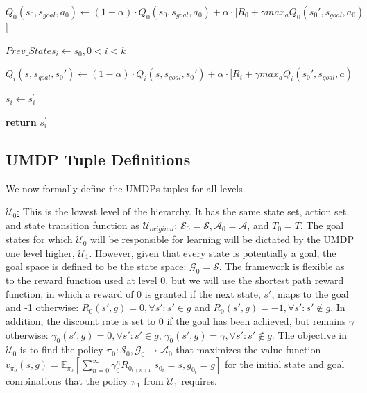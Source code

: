 \documentclass{article} %
\begin{document}
\begin{algorithm}
\begin{algorithmic}
        \State {}
                	\State $Q_0(s_0,s_{goal},a_0) \gets (1-\alpha) \cdot Q_0(s_0,s_{goal},a_0) + \alpha \cdot [R_0 + \gamma max_a Q_0(s_0',s_{goal},a_0)$]
                \EndFor  
                
        \State {}
        \State $Prev\_States_i \gets s_0, 0 < i < k$ 
        
        \State {}
                    	\State $Q_i(s,s_{goal},s_0') \gets (1-\alpha) \cdot Q_i(s,s_{goal},s_0') + \alpha \cdot [R_i + \gamma max_a Q_i(s_0',s_{goal},a)$
            	\EndFor
            \EndFor
        \EndFor
    \EndIf
    
    \State $s_i \gets s_i^{'}$
\EndFor

\State \textbf{return} $s_i^{'}$
\EndFunction



\end{algorithmic}
\end{algorithm}

\subsection{UMDP Tuple Definitions} \label{UMDP}

We now formally define the UMDPs tuples for all levels.

\underline{$\mathcal{U}_0$:} This is the lowest level of the hierarchy. It has the same state set, action set, and state transition function as $\mathcal{U}_{original}$: $\mathcal{S}_0 = \mathcal{S}, \mathcal{A}_0 = \mathcal{A}$, and $T_0 = T$. The goal states for which $\mathcal{U}_0$ will be responsible for learning will be dictated by the UMDP one level higher, $\mathcal{U}_1$.  However, given that every state is potentially a goal, the goal space is defined to be the state space: $\mathcal{G}_0 = \mathcal{S}$. The framework is flexible as to the reward function used at level 0, but we will use the shortest path reward function, in which a reward of 0 is granted if the next state, $s'$, maps to the goal and -1 otherwise: $R_0(s',g) = 0, \forall s': s' \in g$ and $R_0(s',g) = -1, \forall s': s' \notin g$.  In addition, the discount rate is set to 0 if the goal has been achieved, but remains $\gamma$ otherwise: $\gamma_0(s',g) = 0, \forall s': s' \in g$, $\gamma_0(s',g) = \gamma, \forall s': s' \notin g$.  The objective in $\mathcal{U}_0$ is to find the policy $\pi_0: \mathcal{S}_0,\mathcal{G}_0 \rightarrow \mathcal{A}_0$ that maximizes the value function $v_{\pi_0}(s,g) = \mathbb{E}_{\pi_0}[\sum \nolimits_{n=0}^{\infty}\gamma_0^n R_{0_{t+n+1}}|s_{0_t}=s,g_{0_t}=g]$ for the initial state and goal combinations that the policy $\pi_1$ from $\mathcal{U}_1$ requires.
\end{document}
